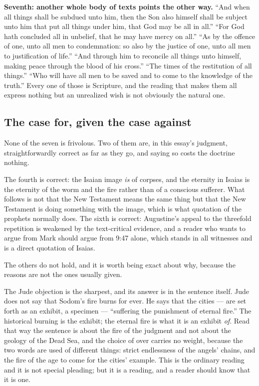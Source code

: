 \textbf{Seventh: another whole body of texts points the other way.} ``And when all things shall be subdued unto him, then the Son also himself shall be subject unto him that put all things under him, that God may be all in all.'' ``For God hath concluded all in unbelief, that he may have mercy on all.'' ``As by the offence of one, unto all men to condemnation: so also by the justice of one, unto all men to justification of life.'' ``And through him to reconcile all things unto himself, making peace through the blood of his cross.'' ``The times of the restitution of all things.'' ``Who will have all men to be saved and to come to the knowledge of the truth.'' Every one of those is Scripture, and the reading that makes them all express nothing but an unrealized wish is not obviously the natural one.

\subsection{The case for, given the case against}

None of the seven is frivolous. Two of them are, in this essay's judgment, straightforwardly correct as far as they go, and saying so costs the doctrine nothing.

The fourth is correct: the Isaian image \emph{is} of corpses, and the eternity in Isaias is the eternity of the worm and the fire rather than of a conscious sufferer. What follows is not that the New Testament means the same thing but that the New Testament is doing something with the image, which is what quotation of the prophets normally does. The sixth is correct: Augustine's appeal to the threefold repetition is weakened by the text-critical evidence, and a reader who wants to argue from Mark should argue from 9:47 alone, which stands in all witnesses and is a direct quotation of Isaias.

The others do not hold, and it is worth being exact about why, because the reasons are not the ones usually given.

The Jude objection is the sharpest, and its answer is in the sentence itself. Jude does not say that Sodom's fire burns for ever. He says that the cities  --- are set forth as an exhibit, a specimen --- ``suffering the punishment of eternal fire.'' The historical burning is the exhibit; the eternal fire is what it is an exhibit \emph{of}. Read that way the sentence is about the fire of the judgment and not about the geology of the Dead Sea, and the choice of  over  carries no weight, because the two words are used of different things: strict endlessness of the angels' chains, and the fire of the age to come for the cities' example. This is the ordinary reading and it is not special pleading; but it is a reading, and a reader should know that it is one.


